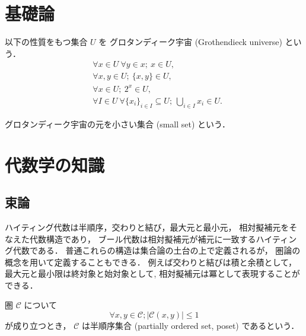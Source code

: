 \documentclass[titlepage]{ltjsreport}
\newcommand{\cat}[1]{\mathscr{#1}}
\newcommand{\objs}[1]{#1}
\newcommand{\mrps}[3]{#1(#2,#3)}
\begin{document}
\appendix

\chapter{基礎論}

\begin{definition}[グロタンディーク宇宙]
  \def\U{U}%
  \def\x{x}%
  \def\y{y}%
  以下の性質をもつ集合 $\U$ を
  グロタンディーク宇宙 (Grothendieck universe) という．
  \begin{align}
     & \forall\x\in\U\ \forall\y\in\x;\ \x\in\U,              \\
     & \forall\x,\y\in\U;\ \{\x,\y\}\in\U,                    \\
     & \forall\x\in\U;\ 2^\x\in\U,                            \\
     & \forall I\in\U\ \forall{\{\x_i\}}_{i\in I}\subseteq\U;
    \ \bigcup_{i\in I}\x_i\in\U.
  \end{align}
\end{definition}

\begin{definition}[小さい集合]\label{def:small-set}
  グロタンディーク宇宙の元を小さい集合 (small set) という．
\end{definition}

\chapter{代数学の知識}

\section{束論}

ハイティング代数は半順序，交わりと結び，最大元と最小元，
相対擬補元をそなえた代数構造であり，
ブール代数は相対擬補元が補元に一致するハイティング代数である．
普通これらの構造は集合論の土台の上で定義されるが，
圏論の概念を用いて定義することもできる．
例えば交わりと結びは積と余積として，最大元と最小限は終対象と始対象として,
相対擬補元は冪として表現することができる．

\begin{definition}[半順序集合]
  圏 $\cat{C}$ について
  \begin{equation}
    \forall x,y\in\objs{\cat{C}};|\mrps{\cat{C}}{x}{y}|\le1
  \end{equation}
  が成り立つとき，
  $\cat{C}$ は半順序集合 (partially ordered set, poset)
  であるという．
\end{definition}
\end{document}
